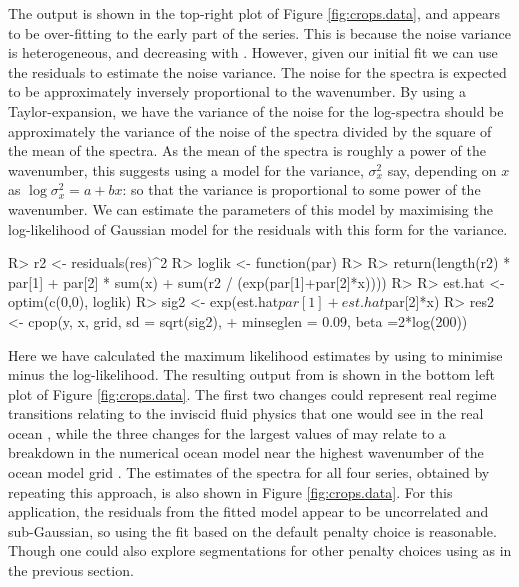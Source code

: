 \documentclass[nojss]{jss}
\begin{document}
The output is shown in the top-right plot of Figure \ref{fig:crops.data}, and appears to be over-fitting to the early part of the series. This is because the noise variance is heterogeneous, and decreasing with . However, given our initial fit we can use the residuals to estimate the noise variance. The noise for the spectra is expected to be approximately inversely proportional to the wavenumber. By using a Taylor-expansion, we have the variance of the noise for the log-spectra should be approximately the variance of the noise of the spectra divided by the square of the mean of the spectra. As the mean of the spectra is roughly a power of the wavenumber, this suggests using a model for the variance, $\sigma^2_x$ say, depending on $x$ as $\log \sigma^2_x = a + bx$: so that the variance is proportional to some power of the wavenumber. We can estimate the parameters of this model by maximising the log-likelihood of Gaussian model for the residuals with this form for the variance.
\begin{CodeChunk}
\begin{CodeInput}
R> r2 <- residuals(res)^2
R> loglik <- function(par)
R> { 
R>  return(length(r2) * par[1] + par[2] * sum(x) 
  + sum(r2 / (exp(par[1]+par[2]*x))))
R> }
R> est.hat <- optim(c(0,0), loglik)
R> sig2 <- exp(est.hat$par[1] + est.hat$par[2]*x)
R> res2 <- cpop(y, x, grid, sd = sqrt(sig2), 
+               minseglen = 0.09, beta =2*log(200))
\end{CodeInput}
\end{CodeChunk}
Here we have calculated the maximum likelihood estimates by using  to minimise minus the log-likelihood. The resulting output from  is shown in the bottom left plot of Figure \ref{fig:crops.data}.  The first two changes could represent real regime transitions relating to the inviscid fluid physics that one would see in the real ocean \cite[see Figure 6a of][]{callies2013interpreting}, while the three changes for the largest values of  may relate to a breakdown in the numerical ocean model near the highest wavenumber of the ocean model grid \cite[]{soufflet2016effective}. The estimates of the spectra for all four series, obtained by repeating this approach, is also shown in Figure \ref{fig:crops.data}. For this application, the residuals from the fitted model appear to be uncorrelated and sub-Gaussian, so using the fit based on the default penalty choice is reasonable. Though one could also explore segmentations for other penalty choices using  as in the previous section.
\end{document}

